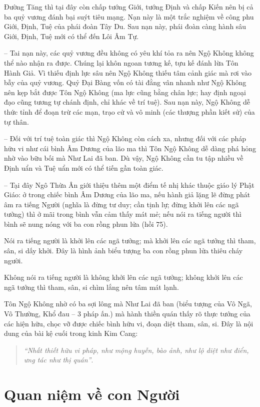 Đường Tăng thì tại đây còn chấp tướng Giới, tướng Định và chấp Kiến nên bị cả ba quỷ vương đánh bại suýt tiêu mạng. Nạn này là một trắc nghiệm về công phu Giới, Định, Tuệ của phái đoàn Tây Du. Sau nạn này, phái đoàn càng hành sâu Giới, Định, Tuệ mới có thể đến Lôi Âm Tự.

-- Tai nạn này, các quỷ vương đều không có yêu khí tỏa ra nên Ngộ Không không thể nào nhận ra được. Chúng lại khôn ngoan tương kế, tựu kế đánh lừa Tôn Hành Giả. Vì thiếu định lực sâu nên Ngộ Không thiếu tâm cảnh giác mà rơi vào bẫy của quỷ vương. Quỷ Đại Bàng vốn có tài đằng vân nhanh như Ngộ Không nên kẹp bắt được Tôn Ngộ Không (ma lực cũng bằng chân lực; hay định ngoại đạo cũng tương tự chánh định, chỉ khác về trí tuệ). Sau nạn này, Ngộ Không dễ thức tỉnh để đoạn trừ các mạn, trạo cử và vô minh (các thượng phần kiết sử) của tự thân.

-- Đối với trí tuệ toàn giác thì Ngộ Không còn cách xa, nhưng đối với các pháp hữu vi như cái bình Âm Dương của lão ma thì Tôn Ngộ Không dễ dàng phá hỏng nhờ vào bữu bối mà Như Lai đã ban. Dù vậy, Ngộ Không cần tu tập nhiều về Định uẩn và Tuệ uẩn mới có thể tiến gần toàn giác.

-- Tại đây Ngô Thừa Ân giới thiệu thêm một điểm tế nhị khác thuộc giáo lý Phật Giáo: ở trong chiếc bình Âm Dương của lão ma, nếu hành giả lặng lẽ đừng phát âm ra tiếng Người (nghĩa là đừng tư duy; cần tịnh lự; đừng khởi lên các ngã tưởng) thì ở mãi trong bình vẫn cảm thấy mát mẻ; nếu nói ra tiếng người thì bình sẽ nung nóng với ba con rồng phun lửa (hồi 75).

Nói ra tiếng người là khởi lên các ngã tưởng; mà khởi lên các ngã tưởng thì tham, sân, si dấy khởi. Đây là hình ảnh biểu tượng ba con rồng phun lửa thiêu cháy người.

Không nói ra tiếng người là không khởi lên các ngã tưởng; không khởi lên các ngã tưởng thì tham, sân, si chìm lắng nên tâm mát lạnh.

Tôn Ngộ Không nhờ có ba sợi lông mà Như Lai đã ban (biểu tượng của Vô Ngã, Vô Thường, Khổ đau -- 3 pháp ấn.) mà hành thiền quán thấy rõ thực tướng của các hiện hữu, chọc vỡ được chiếc bình hữu vi, đoạn diệt tham, sân, si. Đây là nội dung của bài kệ cuối trong kinh Kim Cang:

\begin{quote}
\emph{``Nhất thiết hữu vi pháp, như mộng huyễn, bào ảnh, như lộ diệt như điển, ưng tác như thị quán''}.
\end{quote}

\section{Quan niệm về con Người} %
\label{sec:74_75_con_nguoi}

